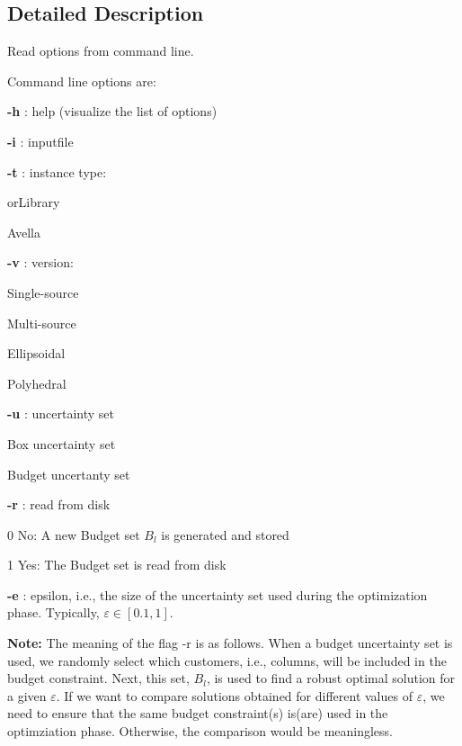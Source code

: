 \subsection{Detailed Description}
Read options from command line. 

Command line options are\+:


\begin{DoxyItemize}
\item {\bfseries -\/h} \+: help (visualize the list of options)
\item {\bfseries -\/i} \+: inputfile
\item {\bfseries -\/t} \+: instance type\+:
\begin{DoxyEnumerate}
\item or\+Library
\item Avella
\end{DoxyEnumerate}
\item {\bfseries -\/v} \+: version\+:
\begin{DoxyEnumerate}
\item Single-\/source
\item Multi-\/source
\item Ellipsoidal
\item Polyhedral
\end{DoxyEnumerate}
\item {\bfseries -\/u} \+: uncertainty set
\begin{DoxyEnumerate}
\item Box uncertainty set
\item Budget uncertanty set
\end{DoxyEnumerate}
\item {\bfseries -\/r} \+: read from disk
\begin{DoxyEnumerate}
\item 0 No\+: A new Budget set $B_l$ is generated and stored
\item 1 Yes\+: The Budget set is read from disk
\end{DoxyEnumerate}
\item {\bfseries -\/e} \+: epsilon, i.\+e., the size of the uncertainty set used during the optimization phase. Typically, $\varepsilon \in \left[0.1, 1\right]$.
\end{DoxyItemize}

{\bfseries Note\+:} The meaning of the flag {\ttfamily -\/r} is as follows. When a budget uncertainty set is used, we randomly select which customers, i.\+e., columns, will be included in the budget constraint. Next, this set, $B_l$, is used to find a robust optimal solution for a given $\varepsilon$. If we want to compare solutions obtained for different values of $\varepsilon$, we need to ensure that the same budget constraint(s) is(are) used in the optimziation phase. Otherwise, the comparison would be meaningless. 

